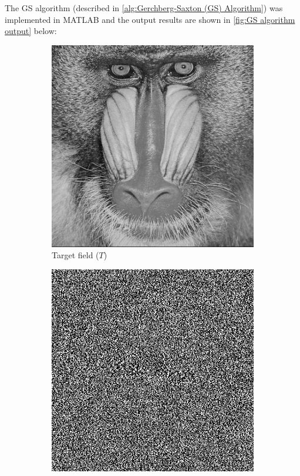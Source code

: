 The GS algorithm (described in \cref{alg:Gerchberg-Saxton (GS) Algorithm}) was implemented in MATLAB and the output results are shown in \cref{fig:GS algorithm output} below:

\begin{figure}[H]
  \centering
  \begin{subfigure}[t]{0.3\textwidth}
    \centering
    \includegraphics[width=\textwidth]{mandrill.png}
    \caption{Target field ($T$)}
  \end{subfigure}
  \hfill
  \begin{subfigure}[t]{0.3\textwidth}
    \centering
    \includegraphics[width=\textwidth]{GS_holo_i_30.png}

\end{subfigure}
\end{figure}
